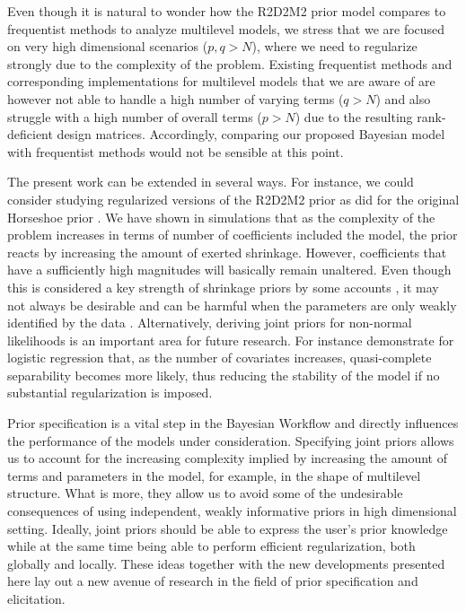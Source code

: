 Even though it is natural to wonder how the R2D2M2 prior model compares to frequentist methods to analyze multilevel models, we stress that we are focused on very high dimensional scenarios ($p,q>N$), where we need to regularize strongly due to the complexity of the problem. Existing frequentist methods and corresponding implementations for multilevel models that we are aware of are however not able to handle a high number of varying terms ($q>N$) and also struggle with a high number of overall terms ($p > N$) due to the resulting rank-deficient design matrices. Accordingly, comparing our proposed Bayesian model with frequentist methods would not be sensible at this point.

The present work can be extended in several ways. For instance, we could consider studying regularized versions of the R2D2M2 prior as \cite{PiironenHorseshoe} did for the original Horseshoe prior \citep{Horseshoe}. We have shown in simulations that as the complexity of the problem increases in terms of number of coefficients included the model, the prior reacts by increasing the amount of exerted shrinkage. However, coefficients that have a sufficiently high magnitudes will basically remain unaltered. Even though this is considered a key strength of shrinkage priors by some accounts \citep{BayesPenalizedRegSara}, it may not always be desirable and can be harmful when the parameters are only weakly identified by the data \citep{PiironenHorseshoe}.  Alternatively, deriving joint priors for non-normal likelihoods is an important area for future research. For instance \cite{bayesianworkflow} demonstrate for logistic regression that, as the number of covariates increases, quasi-complete separability becomes more likely, thus reducing the stability of the model if no substantial regularization is imposed.

Prior specification is a vital step in the Bayesian Workflow \citep{bayesianworkflow} and directly influences the performance of the models under consideration. Specifying joint priors allows us to account for the increasing complexity implied by increasing the amount of terms and parameters in the model, for example, in the shape of multilevel structure. What is more, they allow us to avoid some of the undesirable consequences of using independent, weakly informative priors in high dimensional setting. Ideally, joint priors should be able to express the user's prior knowledge while at the same time being able to perform efficient regularization, both globally and locally. These ideas together with the new developments presented here lay out a new avenue of research in the field of prior specification and elicitation.
